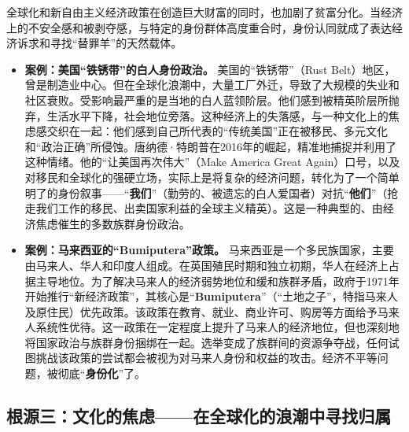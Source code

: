 全球化和新自由主义经济政策在创造巨大财富的同时，也加剧了贫富分化。当经济上的不安全感和被剥夺感，与特定的身份群体高度重合时，身份认同就成了表达经济诉求和寻找“替罪羊”的天然载体。
\begin{itemize}
    \item \textbf{案例：美国“铁锈带”的白人身份政治。} 美国的“铁锈带”（Rust Belt）地区，曾是制造业中心。但在全球化浪潮中，大量工厂外迁，导致了大规模的失业和社区衰败。受影响最严重的是当地的白人蓝领阶层。他们感到被精英阶层所抛弃，生活水平下降，社会地位旁落。这种经济上的失落感，与一种文化上的焦虑感交织在一起：他们感到自己所代表的“传统美国”正在被移民、多元文化和“政治正确”所侵蚀。唐纳德·特朗普在2016年的崛起，精准地捕捉并利用了这种情绪。他的“让美国再次伟大”（Make America Great Again）口号，以及对移民和全球化的强硬立场，实际上是将复杂的经济问题，转化为了一个简单明了的身份叙事——“\textbf{我们}”（勤劳的、被遗忘的白人爱国者）对抗“\textbf{他们}”（抢走我们工作的移民、出卖国家利益的全球主义精英）。这是一种典型的、由经济焦虑催生的多数族群身份政治。

    \item \textbf{案例：马来西亚的“Bumiputera”政策。} 马来西亚是一个多民族国家，主要由马来人、华人和印度人组成。在英国殖民时期和独立初期，华人在经济上占据主导地位。为了解决马来人的经济弱势地位和缓和族群矛盾，政府于1971年开始推行“新经济政策”，其核心是“\textbf{Bumiputera}”（“土地之子”，特指马来人及原住民）优先政策。该政策在教育、就业、商业许可、购房等方面给予马来人系统性优待。这一政策在一定程度上提升了马来人的经济地位，但也深刻地将国家政治与族群身份捆绑在一起。选举变成了族群间的资源争夺战，任何试图挑战该政策的尝试都会被视为对马来人身份和权益的攻击。经济不平等问题，被彻底“\textbf{身份化}”了。
\end{itemize}

\subsection{根源三：文化的焦虑——在全球化的浪潮中寻找归属}

